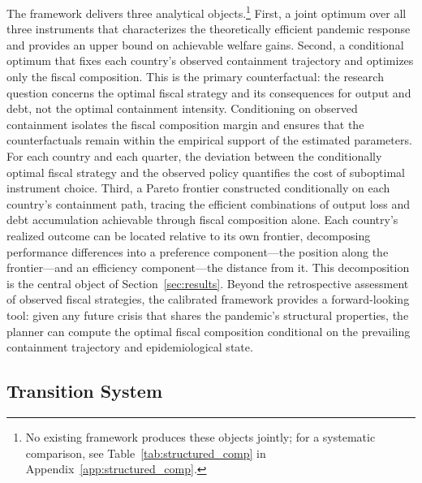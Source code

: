 \documentclass[12pt, a4paper]{article}
\begin{document}
The framework delivers three analytical objects.\footnote{No existing framework produces these objects jointly; for a systematic comparison, see Table~\ref{tab:structured_comp} in
Appendix~\ref{app:structured_comp}.} First, a joint optimum over all three instruments that characterizes the theoretically efficient pandemic response and provides an upper bound on achievable welfare gains. Second, a conditional optimum that fixes each country's observed containment trajectory  and optimizes only the fiscal composition. This is the primary counterfactual: the research question concerns the optimal fiscal strategy and its consequences for output and debt, not the optimal containment intensity. Conditioning on observed containment isolates the fiscal composition margin and ensures that the counterfactuals remain within the empirical support of the estimated parameters. For each country and each quarter, the deviation between the conditionally optimal fiscal strategy and the observed policy quantifies the cost of suboptimal instrument choice. Third, a Pareto frontier constructed conditionally on each country's containment path, tracing the efficient combinations of output loss and debt accumulation achievable through fiscal composition alone. Each country's realized outcome can be located relative to its own frontier, decomposing performance differences into a preference component---the position along the frontier---and an efficiency component---the distance from it. This decomposition is the central object of Section~\ref{sec:results}. Beyond the retrospective assessment of observed fiscal strategies, the calibrated framework provides a forward-looking tool: given any future crisis that shares the pandemic's structural properties, the planner can compute the optimal fiscal composition conditional on the prevailing containment trajectory and epidemiological state.




\subsection{Transition System}
\label{sec:nonlinear}
\end{document}
